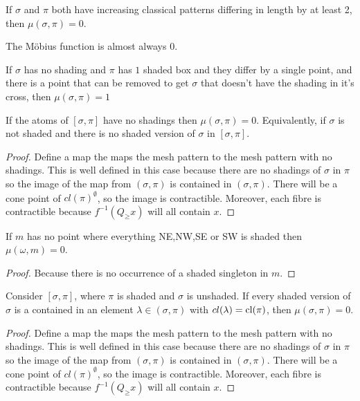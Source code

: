 \documentclass[11pt,a4paper,oneside]{article}
\begin{document}
\begin{conj}
If $\sigma$ and $\pi$ both have increasing classical patterns differing in length by at least 2, then $\mu(\sigma,\pi)=0$.
\end{conj}

\begin{conj}
The M\"obius function is almost always $0$.
\end{conj}

\begin{lem}
If $\sigma$ has no shading and $\pi$ has $1$ shaded box and they differ by a single point, and there is a point that can be removed to get $\sigma$ that doesn't have the shading in it's cross, then $\mu(\sigma,\pi)=1$
\end{lem}

\begin{lem}
If the atoms of $[\sigma,\pi]$ have no shadings then $\mu(\sigma,\pi)=0$. Equivalently, if $\sigma$ is not shaded and there is no shaded version of $\sigma$ in $[\sigma,\pi]$.
\begin{proof}
Define a map the maps the mesh pattern to the mesh pattern with no shadings. This is well defined in this case because there are no shadings of $\sigma$ in $\pi$ so the image of the map from $(\sigma,\pi)$ is contained in $(\sigma,\pi)$. There will be a cone point of $cl(\pi)^\emptyset$, so the image is contractible. Moreover, each fibre is contractible because $f^{-1}(Q_\ge x)$ will all contain $x$.
\end{proof}
\end{lem}

\begin{cor}
If $m$ has no point where everything NE,NW,SE or SW is shaded then $\mu(\omega,m)=0$.
\begin{proof}
Because there is no occurrence of a shaded singleton in $m$.
\end{proof}
\end{cor}

\begin{lem}
Consider $[\sigma,\pi]$, where $\pi$ is shaded and $\sigma$ is unshaded. If every shaded version of $\sigma$ is a contained in an element $\lambda\in(\sigma,\pi)$ with $cl(\lambda)=\operatorname{\textrm{cl}}(\pi)$, then $\mu(\sigma,\pi)=0$.
\begin{proof}
Define a map the maps the mesh pattern to the mesh pattern with no shadings. This is well defined in this case because there are no shadings of $\sigma$ in $\pi$ so the image of the map from $(\sigma,\pi)$ is contained in $(\sigma,\pi)$. There will be a cone point of $cl(\pi)^\emptyset$, so the image is contractible. Moreover, each fibre is contractible because $f^{-1}(Q_\ge x)$ will all contain $x$.
\end{proof}
\end{lem}
\end{document}
